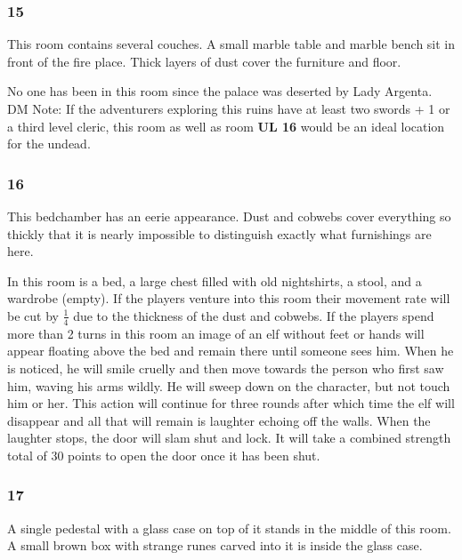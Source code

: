 \documentclass[palace_of_the_silver_princess]{subfiles}
\begin{document}
\subsubsection{15}
\begin{quotebox}
    This room contains several couches. A small marble table and
    marble bench sit in front of the fire place. Thick layers of dust
    cover the furniture and floor.
\end{quotebox}

No one has been in this room since the palace was deserted by Lady
Argenta. DM Note: If the adventurers exploring this ruins have at least
two swords + 1 or a third level cleric, this room as well as room
\textbf{UL 16} would be an ideal location for the undead.

\subsubsection{16}
\begin{quotebox}
    This bedchamber has an eerie appearance. Dust and cobwebs cover
    everything so thickly that it is nearly impossible to distinguish
    exactly what furnishings are here.
\end{quotebox}

In this room is a bed, a large chest filled with old nightshirts, a
stool, and a wardrobe (empty). If the players venture into this room
their movement rate will be cut by \( \frac{1}{4} \) due to the thickness of the
dust and cobwebs. If the players spend more than 2 turns in this room an
image of an elf without feet or hands will appear floating above the bed
and remain there until someone sees him. When he is noticed, he will
smile cruelly and then move towards the person who first saw him, waving
his arms wildly. He will sweep down on the character, but not touch him
or her. This action will continue for three rounds after which time the
elf will disappear and all that will remain is laughter echoing off the
walls. When the laughter stops, the door will slam shut and lock. It
will take a combined strength total of 30 points to open the door once
it has been shut.

\subsubsection{17}
\begin{quotebox}
    A single pedestal with a glass case on top of it stands in the
    middle of this room. A small brown box with strange runes carved
    into it is inside the glass case.
\end{quotebox}
\end{document}
